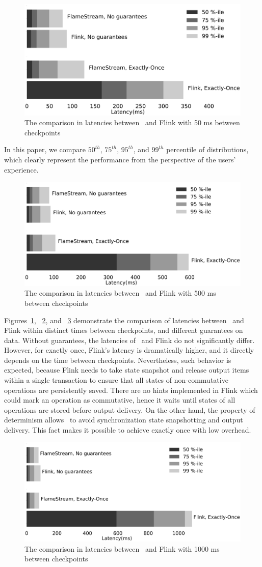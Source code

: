 \begin{figure}[htbp]
  \centering
  \includegraphics[width=.5\textwidth]{pics/comparison50}
  \caption{The comparison in latencies between \FlameStream\ and Flink with 50 ms between checkpoints}
  \label {comparison50}
\end{figure}

In this paper, we compare $50^{th}$, $75^{th}$, $95^{th}$, and $99^{th}$ percentile of distributions, which clearly represent the performance from the perspective of the users' experience.

\begin{figure}[htbp]
  \centering
  \includegraphics[width=.5\textwidth]{pics/comparison500}
  \caption{The comparison in latencies between \FlameStream\ and Flink with 500 ms between checkpoints}
  \label {comparison500}
\end{figure}

Figures~\ref{comparison50}, ~\ref{comparison500}, and ~\ref{comparison1000} demonstrate      the comparison of latencies between \FlameStream\ and Flink within distinct times between checkpoints, and different guarantees on data. Without guarantees, the latencies of \FlameStream\ and Flink do not significantly differ. However, for exactly once, Flink's latency is dramatically higher, and it directly depends on the time between checkpoints. Nevertheless, such behavior is expected, because Flink needs to take state snapshot and release output items within a single transaction to ensure that all states of non-commutative operations are persistently saved. There are no hints implemented in Flink which could mark an operation as commutative, hence it waits until states of all operations are stored before output delivery. 
On the other hand, the property of determinism allows \FlameStream\ to avoid synchronization  state snapshotting and output delivery. This fact makes it possible to achieve exactly once with low overhead.

\begin{figure}[htbp]
  \centering
  \includegraphics[width=.5\textwidth]{pics/comparison1000}
  \caption{The comparison in latencies between \FlameStream\ and Flink with 1000 ms between checkpoints}
  \label {comparison1000}
\end{figure}

